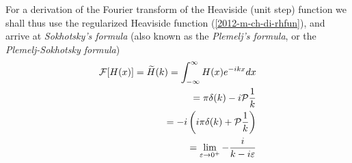 {%
\eproof
}
\fi
For a derivation of  the Fourier transform of the Heaviside (unit step) function
we shall thus use the  regularized Heaviside function (\ref{2012-m-ch-di-rhfun}), and arrive at
{\em Sokhotsky's  formula} (also known as the {\em Plemelj's  formula}, or the {\em Plemelj-Sokhotsky formula})
\begin{equation}
\begin{split}
 {\cal F}[H(x)]=\widetilde{H}(k)=   \int_{-\infty}^\infty  H(x) e^{-i{kx}} dx   \\
\qquad =    \pi \delta(k) -  i {\cal P}  \frac{1}{k} \\
\qquad =   -i \left(i\pi \delta(k) + {\cal P} \frac{1}{k}\right)\\
\qquad =   \lim_{\varepsilon \rightarrow 0^+} -\frac{i}{k-i\varepsilon }
\end{split}
\end{equation}

